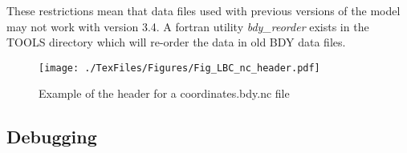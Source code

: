 \mbox{}

These restrictions mean that data files used with previous
versions of
the model may not work with version 3.4. A fortran utility
{\it bdy\_reorder} exists in the TOOLS directory which will
re-order the
data in old BDY data files.

\begin{figure}[!t]     \begin{center}
\texttt{[image: ./TexFiles/Figures/Fig\_LBC\_nc\_header.pdf]}
\caption {     \label{Fig_LBC_nc_header}
Example of the header for a coordinates.bdy.nc file}
\end{center}   \end{figure}


\subsection{Debugging}
\label{Debug}
